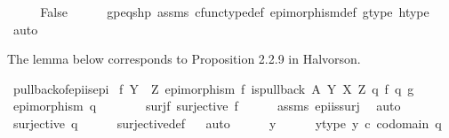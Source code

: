 \begin{isabellebody}
\isamarkupfalse%
\isanewline
\ \ \isamarkupfalse%
\ \isamarkupfalse%
\ False\isanewline
\ \ \ \ \isamarkupfalse%
\ gp{\isacharunderscore}{\kern0pt}eqs{\isacharunderscore}{\kern0pt}hp\ assms\ cfunc{\isacharunderscore}{\kern0pt}type{\isacharunderscore}{\kern0pt}def\ epimorphism{\isacharunderscore}{\kern0pt}def\ g{\isacharunderscore}{\kern0pt}type\ h{\isacharunderscore}{\kern0pt}type\ \isamarkupfalse%
\ auto\isanewline
{}\isamarkupfalse%
%
\endisatagproof
{\isafoldproof}%
%
\isadelimproof
%
\endisadelimproof
%
\begin{isamarkuptext}%
The lemma below corresponds to Proposition 2.2.9 in Halvorson.%
\end{isamarkuptext}\isamarkuptrue%
\isamarkupfalse%
\ pullback{\isacharunderscore}{\kern0pt}of{\isacharunderscore}{\kern0pt}epi{\isacharunderscore}{\kern0pt}is{\isacharunderscore}{\kern0pt}epi{}{\isacharcolon}{\kern0pt}\isanewline
{}\ {\isachardoublequoteopen}f{\isacharcolon}{\kern0pt}\ Y\ {\isasymrightarrow}\ Z{\isachardoublequoteclose}\ {\isachardoublequoteopen}epimorphism\ f{\isachardoublequoteclose}\ {\isachardoublequoteopen}is{\isacharunderscore}{\kern0pt}pullback\ A\ Y\ X\ Z\ q{}\ f\ q{}\ g{\isachardoublequoteclose}\isanewline
{}\ {\isachardoublequoteopen}epimorphism\ q{}{\isachardoublequoteclose}\ \isanewline
%
\isadelimproof
%
\endisadelimproof
%
\isatagproof
{}\isamarkupfalse%
\ {\isacharminus}{\kern0pt}\ \isanewline
\ \ \isamarkupfalse%
\ surj{\isacharunderscore}{\kern0pt}f{\isacharcolon}{\kern0pt}\ {\isachardoublequoteopen}surjective\ f{\isachardoublequoteclose}\isanewline
\ \ \ \ \isamarkupfalse%
\ assms{\isacharparenleft}{\kern0pt}{}{\isacharcomma}{\kern0pt}{}{\isacharparenright}{\kern0pt}\ epi{\isacharunderscore}{\kern0pt}is{\isacharunderscore}{\kern0pt}surj\ \isamarkupfalse%
\ auto\isanewline
\ \ \isamarkupfalse%
\ {\isachardoublequoteopen}surjective\ {\isacharparenleft}{\kern0pt}q{}{\isacharparenright}{\kern0pt}{\isachardoublequoteclose}\isanewline
\ \ \ \ \isamarkupfalse%
\ surjective{\isacharunderscore}{\kern0pt}def\isanewline
\ \ \isamarkupfalse%
{\isacharparenleft}{\kern0pt}auto{\isacharparenright}{\kern0pt}\isanewline
\ \ \ \ \isamarkupfalse%
\ y\isanewline
\ \ \ \ \isamarkupfalse%
\ y{\isacharunderscore}{\kern0pt}type{\isacharcolon}{\kern0pt}\ {\isachardoublequoteopen}y\ {\isasymin}\isactrlsub c\ codomain\ q{}{\isachardoublequoteclose}\isanewline

\end{isabellebody}
